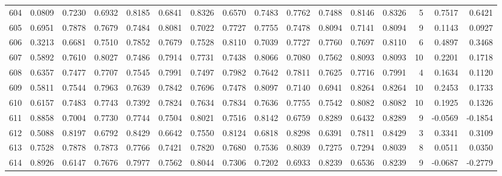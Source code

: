 \begin{tabular}{lrrrrrrrrrrrrrrr}
604 &      0.0809 &  0.7230 &  0.6932 &  0.8185 &  0.6841 &  0.8326 &  0.6570 &  0.7483 &  0.7762 &  0.7488 &   0.8146 &     0.8326 &      5 &                    0.7517 &                     0.6421 \\
605 &      0.6951 &  0.7878 &  0.7679 &  0.7484 &  0.8081 &  0.7022 &  0.7727 &  0.7755 &  0.7478 &  0.8094 &   0.7141 &     0.8094 &      9 &                    0.1143 &                     0.0927 \\
606 &      0.3213 &  0.6681 &  0.7510 &  0.7852 &  0.7679 &  0.7528 &  0.8110 &  0.7039 &  0.7727 &  0.7760 &   0.7697 &     0.8110 &      6 &                    0.4897 &                     0.3468 \\
607 &      0.5892 &  0.7610 &  0.8027 &  0.7486 &  0.7914 &  0.7731 &  0.7438 &  0.8066 &  0.7080 &  0.7562 &   0.8093 &     0.8093 &     10 &                    0.2201 &                     0.1718 \\
608 &      0.6357 &  0.7477 &  0.7707 &  0.7545 &  0.7991 &  0.7497 &  0.7982 &  0.7642 &  0.7811 &  0.7625 &   0.7716 &     0.7991 &      4 &                    0.1634 &                     0.1120 \\
609 &      0.5811 &  0.7544 &  0.7963 &  0.7639 &  0.7842 &  0.7696 &  0.7478 &  0.8097 &  0.7140 &  0.6941 &   0.8264 &     0.8264 &     10 &                    0.2453 &                     0.1733 \\
610 &      0.6157 &  0.7483 &  0.7743 &  0.7392 &  0.7824 &  0.7634 &  0.7834 &  0.7636 &  0.7755 &  0.7542 &   0.8082 &     0.8082 &     10 &                    0.1925 &                     0.1326 \\
611 &      0.8858 &  0.7004 &  0.7730 &  0.7744 &  0.7504 &  0.8021 &  0.7516 &  0.8142 &  0.6759 &  0.8289 &   0.6432 &     0.8289 &      9 &                   -0.0569 &                    -0.1854 \\
612 &      0.5088 &  0.8197 &  0.6792 &  0.8429 &  0.6642 &  0.7550 &  0.8124 &  0.6818 &  0.8298 &  0.6391 &   0.7811 &     0.8429 &      3 &                    0.3341 &                     0.3109 \\
613 &      0.7528 &  0.7878 &  0.7873 &  0.7766 &  0.7421 &  0.7820 &  0.7680 &  0.7536 &  0.8039 &  0.7275 &   0.7294 &     0.8039 &      8 &                    0.0511 &                     0.0350 \\
614 &      0.8926 &  0.6147 &  0.7676 &  0.7977 &  0.7562 &  0.8044 &  0.7306 &  0.7202 &  0.6933 &  0.8239 &   0.6536 &     0.8239 &      9 &                   -0.0687 &                    -0.2779 \\

\end{tabular}
